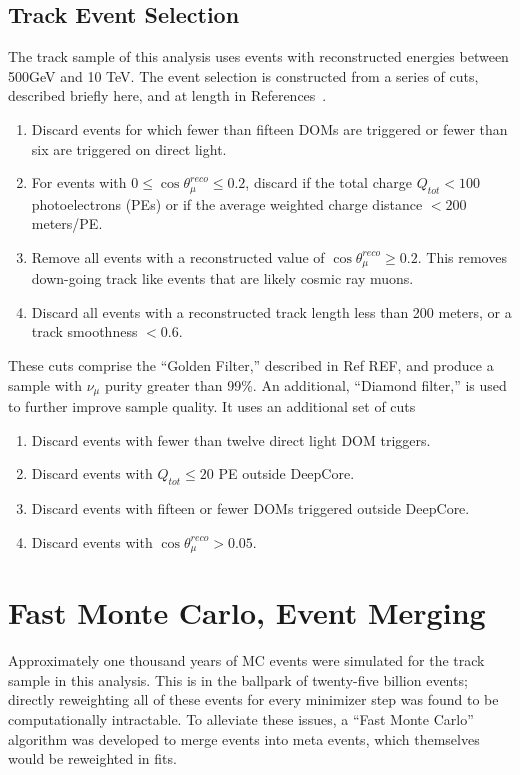 \documentclass[main.tex]{subfiles}
\begin{document}
\subsection{Track Event Selection}

The track sample of this analysis uses events with reconstructed energies between 500GeV and 10 TeV. 
The event selection is constructed from a series of cuts, described briefly here, and at length in References~\cite{Aartsen_2020, Aartsen_2020_prd, axani2020sterile}. %

\begin{enumerate}
    \item Discard events for which fewer than fifteen DOMs are triggered or fewer than six are triggered on direct light.
    \item  For events with $0\leq\cos\theta_{\mu}^{reco}\leq 0.2$, discard if the total charge $Q_{tot}<100$ photoelectrons (PEs) or if the average weighted charge distance $<200$ meters/PE. 
    \item Remove all events with a reconstructed value of $\cos\theta_{\mu}^{reco}\geq 0.2$. This removes down-going track like events that are likely cosmic ray muons. 
    \item Discard all events with a reconstructed track length less than 200 meters, or a track smoothness $<0.6$.
\end{enumerate}

These cuts comprise the ``Golden Filter,'' described in Ref REF, and produce a sample with $\nu_{\mu}$ purity greater than 99\%. %
An additional, ``Diamond filter,'' is used to further improve sample quality. 
It uses an additional set of cuts
\begin{enumerate}
    \item Discard events with fewer than twelve direct light DOM triggers. 
    \item Discard events with $Q_{tot}\leq20$ PE outside DeepCore. 
    \item Discard events with fifteen or fewer DOMs triggered outside DeepCore. 
    \item Discard events with $\cos\theta_{\mu}^{reco}>0.05$.
\end{enumerate}


\section{Fast Monte Carlo, Event Merging}

Approximately one thousand years of MC events were simulated for the track sample in this analysis.
This is in the ballpark of twenty-five billion events; directly reweighting all of these events for every minimizer step was found to be computationally intractable. 
To alleviate these issues, a ``Fast Monte Carlo'' algorithm was developed to merge events into meta events, which themselves would be reweighted in fits. 
\end{document}
